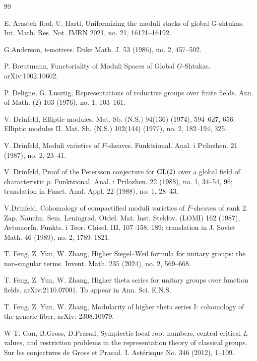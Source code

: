 
\clearpage
{}
{}

\begin{thebibliography}{99}

E. Arasteh Rad, U. Hartl,
Uniformizing the moduli stacks of global G-shtukas.
Int. Math. Res. Not. IMRN 2021, no. 21, 16121--16192.

G.Anderson, 
$t$-motives.
Duke Math. J. 53 (1986), no. 2, 457--502.

P. Breutmann, 
Functoriality of Moduli Spaces of Global $G$-Shtukas. 
arXiv:1902.10602.

P. Deligne, G. Lusztig,
Representations of reductive groups over finite fields. 
Ann. of Math. (2) 103 (1976), no. 1, 103--161.

V. Drinfeld,
Elliptic modules. Mat. Sb. (N.S.) 94(136) (1974), 594--627, 656. Elliptic modules II. Mat. Sb. (N.S.) 102(144) (1977), no. 2, 182--194, 325.

V. Drinfeld,
Moduli varieties of $F$-sheaves. 
Funktsional. Anal. i Prilozhen. 21 (1987), no. 2, 23--41. 
 
V. Drinfeld, 
Proof of the Petersson conjecture for $\textup{GL}(2)$ over a global field of characteristic $p$. 
Funktsional. Anal. i Prilozhen. 22 (1988), no. 1, 34--54, 96; translation in Funct. Anal. Appl. 22 (1988), no. 1, 28--43.

V.Drinfeld, 
Cohomology of compactified moduli varieties of $F$-sheaves of rank 2.  
Zap. Nauchn. Sem. Leningrad. Otdel. Mat. Inst. Steklov. (LOMI) 162 (1987), Avtomorfn. Funkts. i Teor. Chisel. III, 107--158, 189; translation in J. Soviet Math. 46 (1989), no. 2, 1789--1821.

T. Feng, Z. Yun, W. Zhang,
Higher Siegel--Weil formula for unitary groups: the non-singular terms.
Invent. Math. 235 (2024), no. 2, 569--668.

T. Feng, Z. Yun, W. Zhang,
Higher theta series for unitary groups over function fields.
arXiv:2110.07001. To appear in Ann. Sci. E.N.S.

T. Feng, Z. Yun, W. Zhang,
Modularity of higher theta series I: cohomology of the generic fiber.
arXiv: 2308.10979.

W-T. Gan, B.Gross, D.Prasad,
Symplectic local root numbers, central critical $L$ values, and restriction problems in the representation theory of classical groups. 
Sur les conjectures de Gross et Prasad. I. Ast\'erisque No. 346 (2012), 1--109.


\end{thebibliography}
